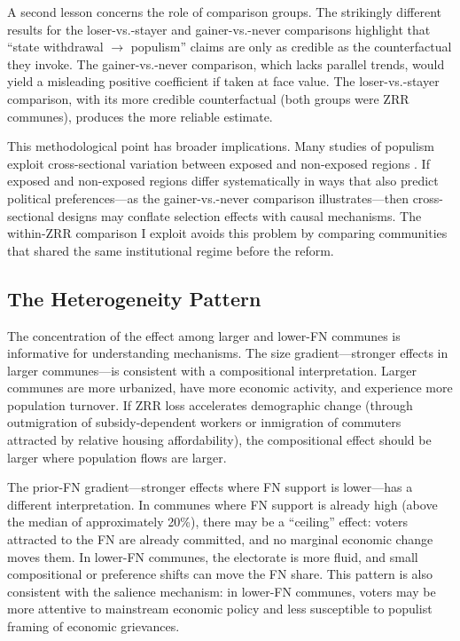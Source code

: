 \documentclass[12pt]{article}
\begin{document}
A second lesson concerns the role of comparison groups. The strikingly different results for the loser-vs.-stayer and gainer-vs.-never comparisons highlight that ``state withdrawal $\to$ populism'' claims are only as credible as the counterfactual they invoke. The gainer-vs.-never comparison, which lacks parallel trends, would yield a misleading positive coefficient if taken at face value. The loser-vs.-stayer comparison, with its more credible counterfactual (both groups were ZRR communes), produces the more reliable estimate.

This methodological point has broader implications. Many studies of populism exploit cross-sectional variation between exposed and non-exposed regions \citep{colantone2018trade, broz2021populism}. If exposed and non-exposed regions differ systematically in ways that also predict political preferences---as the gainer-vs.-never comparison illustrates---then cross-sectional designs may conflate selection effects with causal mechanisms. The within-ZRR comparison I exploit avoids this problem by comparing communities that shared the same institutional regime before the reform.

\subsection{The Heterogeneity Pattern}

The concentration of the effect among larger and lower-FN communes is informative for understanding mechanisms. The size gradient---stronger effects in larger communes---is consistent with a compositional interpretation. Larger communes are more urbanized, have more economic activity, and experience more population turnover. If ZRR loss accelerates demographic change (through outmigration of subsidy-dependent workers or inmigration of commuters attracted by relative housing affordability), the compositional effect should be larger where population flows are larger.

The prior-FN gradient---stronger effects where FN support is lower---has a different interpretation. In communes where FN support is already high (above the median of approximately 20\%), there may be a ``ceiling'' effect: voters attracted to the FN are already committed, and no marginal economic change moves them. In lower-FN communes, the electorate is more fluid, and small compositional or preference shifts can move the FN share. This pattern is also consistent with the salience mechanism: in lower-FN communes, voters may be more attentive to mainstream economic policy and less susceptible to populist framing of economic grievances.
\end{document}
